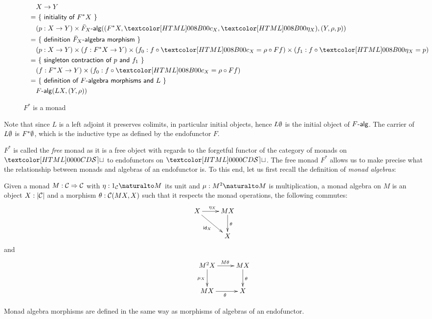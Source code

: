 \begin{figure}
  \centering
    \begin{align*}
    &&&X \to Y \\
    &&=&\ \reasontext{initiality of $F^* X$} \\
    &&&(p : X \to Y) \times \algcat{\bar{F}_X}((F^* X , \Fstarc_X , \Fstareta_X),(Y,\rho,p)) \\
    &&=&\ \reasontext{definition $\bar{F}_X$-algebra morphism} \\
    &&&(p : X \to Y) \times (f : F^* X \to Y) \times (f_0 : f \circ \Fstarc_X = \rho \circ Ff) \times (f_1 : f \circ \Fstareta_X = p) \\
    &&=&\ \reasontext{singleton contraction of $p$ and $f_1$} \\
    &&&(f : F^* X \to Y) \times (f_0 : f \circ \Fstarc_X = \rho \circ Ff) \\
    &&=&\ \reasontext{definition of $F$-algebra morphisms and $L$} \\
    &&&\algcat{F}(L X , (Y,\rho))
  \end{align*}
  \caption{$F^*$ is a monad}
  \label{f-star-monad}
\end{figure}

Note that since $L$ is a left adjoint it preserves colimits, in
particular initial objects, hence $L \emptyset$ is the initial object
of $\algcat{F}$. The carrier of $L \emptyset$ is $F^* \emptyset$, which
is the inductive type as defined by the endofunctor $F$.

$F^*$ is called the \emph{free} monad as it is a free object with
regards to the forgetful functor of the category of monads on $\SET$
to endofunctors on $\SET$. The free monad $F^*$ allows us to make
precise what the relationship between monads and algebras of an
endofunctor is. To this end, let us first recall the definition of
\emph{monad algebras}:

\begin{definition}
  Given a monad $M : \mathcal{C} \Rightarrow \mathcal{C}$ with $\eta : \Nat{1_{\Cc}}{M}$
  its unit and $\mu : \Nat{M^2}{M}$ is multiplication, a monad algebra
  on $M$ is an object $X : | \mathcal{C} |$ and a morphism
  $\theta : \mathcal{C}(MX,X)$ such that it respects the monad operations, \ie
  the following commutes:
  $$
  \xymatrix{
    X \ar[r]^{\eta_X} \ar[dr]_{\id_X} &MX \ar[d]^{\theta} \\
    &X }
  $$
  and
  $$
  \xymatrix{
    &M^2 X \ar[r]^{M \theta} \ar[d]_{\mu_X} &MX \ar[d]^{\theta} \\
    &MX \ar[r]_{\theta} &X }
  $$
  
  Monad algebra morphisms are defined in the same way as morphisms of
  algebras of an endofunctor.
\end{definition}

